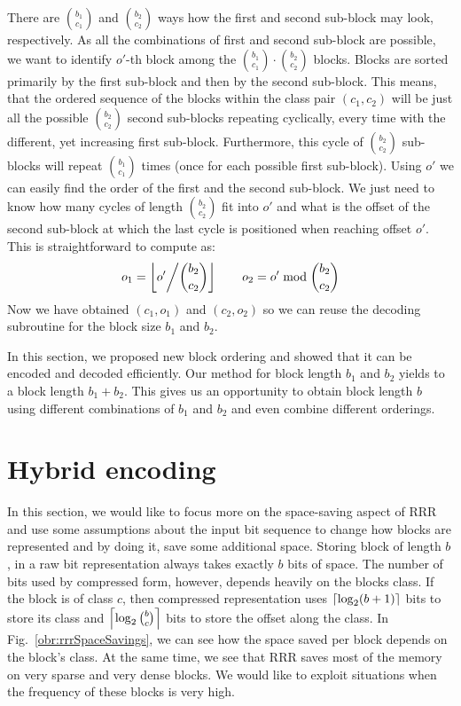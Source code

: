 There are ${b_1 \choose c_1}$ and ${b_2 \choose c_2}$ ways how the first and second
sub-block may look, respectively. As all the combinations of first and second sub-block are
possible, we want to identify $o'$-th block among the ${b_1 \choose c_1}\cdot {b_2 \choose c_2}$
blocks. Blocks are sorted primarily by the first sub-block and then by the second sub-block.
This means, that the ordered sequence of the blocks within the class pair $(c_1, c_2)$ will be
just all the possible ${b_2 \choose c_2}$ second sub-blocks repeating cyclically, every time
with the different, yet increasing first sub-block. Furthermore, this cycle of
${b_2 \choose c_2}$ sub-blocks will repeat ${b_1 \choose c_1}$ times (once for each possible
first sub-block). Using $o'$ we can easily find the order of the first and the second sub-block.
We just need to know how many cycles of length ${b_2 \choose c_2}$ fit into $o'$ and what is
the offset of the second sub-block at which the last cycle is positioned when reaching 
offset $o'$. This is straightforward to compute as:
$$o_1 = \left\lfloor o' \middle/{b_2 \choose c_2} \right\rfloor\qquad o_2 = o'\bmod {b_2 \choose c_2}$$
Now we have obtained $(c_1, o_1)$ and $(c_2, o_2)$ so we can reuse the decoding subroutine for the
block size $b_1$ and $b_2$.

In this section, we proposed new block ordering and showed that it can be encoded and decoded
efficiently. Our method for block length $b_1$ and $b_2$ yields to a block length $b_1+b_2$.
This gives us an opportunity to obtain block length $b$ using different combinations of $b_1$
and $b_2$ and even combine different orderings.

\section{Hybrid encoding}


In this section, we would like to focus more on the space-saving aspect of RRR and use some
assumptions about the input bit sequence to change how blocks are represented and by doing
it, save some additional space. Storing block of length $b$, in a raw bit representation
always takes exactly $b$ bits of space. The number of bits used by compressed form, however,
depends heavily on the blocks class. If the block is of class $c$, then compressed
representation uses $\left\lceil \log_2 (b+1) \right\rceil$ bits to store its class and $\left\lceil \log_2{b\choose c} \right\rceil$
bits to store the offset along the class. In Fig.~\ref{obr:rrrSpaceSavings}, we can see
how the space saved per block depends on the block’s class. At the same time, we see
that RRR saves most of the memory on very sparse and very dense blocks. We would like
to exploit situations when the frequency of these blocks is very high.


